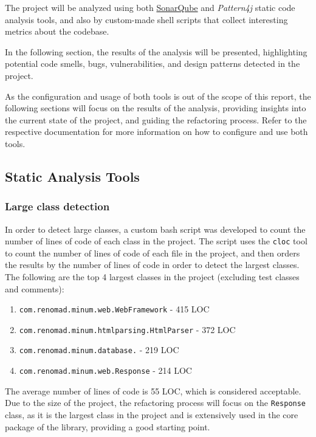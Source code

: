 The project will be analyzed using both \href{https://www.sonarsource.com/}{SonarQube} and \textit{Pattern4j} static code analysis tools, and also by custom-made shell scripts that collect interesting metrics about the codebase.

In the following section, the results of the analysis will be presented, highlighting potential code smells, bugs, vulnerabilities, and design patterns detected in the project.

As the configuration and usage of both tools is out of the scope of this report, the following sections will focus on the results of the analysis, providing insights into the current state of the project, and guiding the refactoring process. Refer to the respective documentation for more information on how to configure and use both tools.

\subsection{Static Analysis Tools}

\subsubsection{Large class detection}

In order to detect large classes, a custom bash script was developed to count the number of lines of code of each class in the project. The script uses the \texttt{cloc} tool to count the number of lines of code of each file in the project, and then orders the results by the number of lines of code in order to detect the largest classes. The following are the top 4 largest classes in the project (excluding test classes and comments):

\begin{enumerate}
	\item \texttt{com.renomad.minum.web.WebFramework} - 415 LOC
	\item \texttt{com.renomad.minum.htmlparsing.HtmlParser} - 372 LOC
	\item \texttt{com.renomad.minum.database.} - 219 LOC
	\item \texttt{com.renomad.minum.web.Response} - 214 LOC
\end{enumerate}

\noindent The average number of lines of code is 55 LOC, which is considered acceptable. Due to the size of the project, the refactoring process will focus on the \texttt{Response} class, as it is the largest class in the project and is extensively used in the core package of the library, providing a good starting point.

